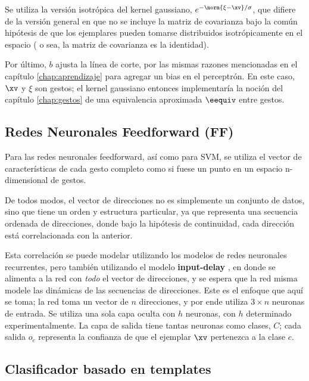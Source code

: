 Se utiliza la versión isotrópica del kernel gaussiano, $e^{-\norm{\xi-\xv}/\sigma}$, que difiere de la versión general en que no se incluye la matriz de covarianza bajo la común hipótesis de que los ejemplares pueden tomarse distribuidos isotrópicamente en el espacio ( o sea, la matriz de covarianza es la identidad).

Por último, $b$ ajusta la línea de corte, por las mismas razones mencionadas en el capítulo \ref{chap:aprendizaje} para agregar un bias en el perceptrón. En este caso, $\xv$ y $\xi$ son gestos; el kernel gaussiano entonces implementaría la noción del capítulo \ref{chap:gestos} de una equivalencia aproximada $\eequiv$ entre gestos.

\subsection{Redes Neuronales Feedforward (FF)}

Para las redes neuronales feedforward, así como para SVM, se utiliza el vector de características de cada gesto completo como si fuese un punto en un espacio n-dimensional de gestos.

De todos modos, el vector de direcciones no es simplemente un conjunto de datos, sino que tiene un orden y estructura particular, ya que representa una secuencia ordenada de direcciones, donde bajo la hipótesis de continuidad, cada dirección está correlacionada con la anterior. 

Esta correlación se puede modelar utilizando los modelos de redes neuronales recurrentes, pero también utilizando el modelo \textbf{input-delay} \cite{Haykin1998}, en donde se alimenta a la red con \textit{todo} el vector de direcciones, y se espera que la red misma modele las dinámicas de las secuencias de direcciones. Este es el enfoque que aquí se toma; la red toma un vector de $n$ direcciones, y por ende utiliza $3 \times n$ neuronas de entrada. Se utiliza una sola capa oculta con $h$ neuronas, con $h$ determinado experimentalmente. La capa de salida tiene tantas neuronas como clases, $C$; cada salida $o_c$ representa la confianza de que el ejemplar $\xv$ pertenezca a la clase $c$.
 

\subsection{Clasificador basado en templates}
